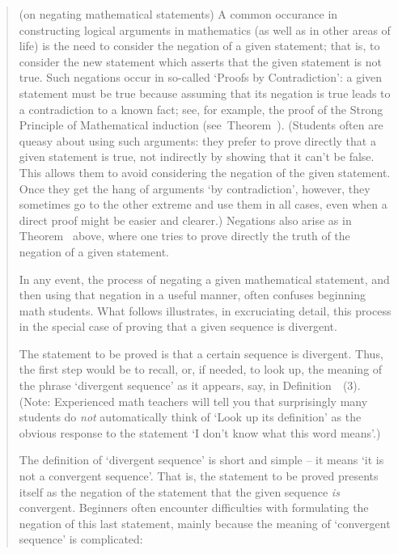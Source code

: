 \begin{quotation}
{\footnotesize 
\underline{\Note}  (on negating mathematical statements)
A common occurance in constructing logical arguments in mathematics (as well as in other areas of life) is the need to consider the negation of a given statement;
    that is, to consider the new statement which asserts that the given statement is not true. Such negations occur in so-called `Proofs by Contradiction':
    a given statement must be true because assuming that its negation is true leads to a contradiction to a known fact;
    see, for example, the proof of the Strong Principle of Mathematical induction (see~Theorem~).
    (Students often are queasy about using such arguments: they prefer to prove directly that a given statement is true,
    not indirectly by showing that it can't be false. This allows them to avoid considering the negation of the given statement.
    Once they get the hang of arguments `by contradiction', however, they sometimes go to the other extreme and use them in all cases, even when a direct proof might be easier and clearer.)
    Negations also arise as in Theorem~ above, where one tries to prove directly the truth of the negation of a given statement.

    In any event, the process of negating a given mathematical statement, and then using that negation in a useful manner, often confuses beginning math students.
    What follows illustrates, in excruciating detail, this process in the special case of proving that a given sequence is divergent.

        The statement to be proved is that a certain sequence is divergent. Thus, the first step would be to recall, or, if needed, to look up,
    the meaning of the phrase `divergent sequence' as it appears, say, in Definition~~(3).
    (Note: Experienced math teachers will tell you that surprisingly many students do {\em not} automatically think of
    `Look up its definition' as the obvious response to the statement `I don't know what this word means'.)

        The definition of `divergent sequence' is short and simple -- it means `it is not a convergent sequence'.
    That is, the statement to be proved presents itself as the negation of the statement that the given sequence {\em is} convergent.
    Beginners often encounter difficulties with formulating the negation of this last statement, mainly because the meaning of `convergent sequence' is complicated:

}
\end{quotation}
